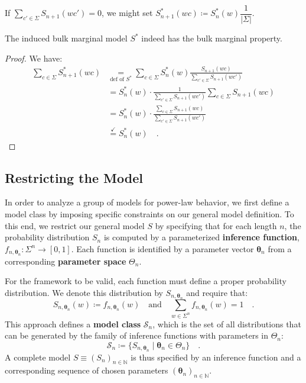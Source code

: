 \documentclass[../../main.tex]{subfiles}
\begin{document}
    \begin{remark}
        If $\sum_{c' \in \Sigma} S_{n+1}(wc') = 0$, we might set $S_{n + 1}^*(wc) \coloneqq S_n^*(w) \dfrac{1}{|\Sigma|}$.
    \end{remark}

    \begin{lemma}
        The induced bulk marginal model $S^*$ indeed has the bulk marginal property.
    \end{lemma}
    \vspace{-2.5em}
    \begin{proof}
        We have:
        \begin{align*}
            \sum_{c \in \Sigma} S_{n + 1}^*(wc) 
            &\underset{\text{def of } S^*}{=} \sum_{c \in \Sigma} S_n^*(w) \frac{S_{n+1}(wc)}{\sum_{c' \in \Sigma} S_{n+1}(wc')} \\
            &= S_n^*(w) \cdot \frac{1}{\sum_{c' \in \Sigma} S_{n+1}(wc')} \sum_{c \in \Sigma} S_{n+1}(wc) \\
            &= S_n^*(w) \cdot \frac{\sum_{c \in \Sigma} S_{n+1}(wc)}{\sum_{c' \in \Sigma} S_{n+1}(wc')} \\
            &\overset{\checkmark}{=} S_n^*(w) \quad .
        \end{align*}
    \end{proof}

\subsection{Restricting the Model}
    In order to analyze a group of models for power-law behavior, we first define a model class by imposing specific constraints on our general model definition. To this end, we restrict our general model $S$ by specifying that for each length $n$, the probability distribution $S_n$ is computed by a parameterized \textbf{inference function}, $f_{n, \bm{\theta}_n}: \Sigma^n \to [0, 1]$. Each function is identified by a parameter vector $\bm{\theta}_n$ from a corresponding \textbf{parameter space} $\Theta_n$.

    For the framework to be valid, each function must define a proper probability distribution. We denote this distribution by $S_{n, \bm{\theta}_n}$ and require that:
    \[
        S_{n, \bm{\theta}_n}(w) \coloneqq f_{n, \bm{\theta}_n}(w) \quad \text{and} \quad \sum_{w \in \Sigma^n} f_{n, \bm{\theta}_n}(w) = 1 \quad .
    \]
    This approach defines a \textbf{model class} $\mathcal{S}_n$, which is the set of all distributions that can be generated by the family of inference functions with parameters in $\Theta_n$:
    \[
        \mathcal{S}_n \coloneqq \{ S_{n, \bm{\theta}_n} \mid \bm{\theta}_n \in \Theta_n \} \quad .
    \]
    A complete model $S \equiv (S_n)_{n \in \mathbb{N}}$ is thus specified by an inference function and a corresponding sequence of chosen parameters $(\bm{\theta}_n)_{n \in \mathbb{N}}$.
\end{document}
